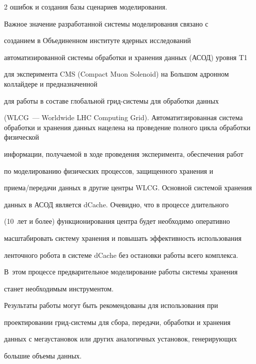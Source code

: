 \begin{multicols}{2}
ошибок и создания базы сценариев моделирования. 


   


   Важное значение разработанной системы моделирования связано с 


созданием в Объединенном институте ядерных исследований 


автоматизированной системы обработки и хранения данных (АСОД) уровня T1 


для эксперимента CMS (Compact Muon Solenoid) на Большом адронном коллайдере и предназначенной 


для работы в составе глобальной грид-сис\-те\-мы для обработки данных 


(WLCG~--- Worldwide LHC Computing Grid). Автоматитзированная система обработки и хранения данных нацелена на проведение полного цикла обработки физической 


информации, получаемой в ходе проведения эксперимента, обеспечения работ 


по моделированию физических процессов, защищенного хранения и 


при\-ема/пе\-ре\-да\-чи данных в другие центры WLCG. Основной системой хранения 


данных в АСОД является dCache. Очевидно, что в процессе длительного 


(10~лет и более) функционирования центра будет необходимо оперативно 


масштабировать систему хранения и повышать эффективность использования 


ленточного робота в системе dCache без остановки работы всего комплекса. 


В~этом процессе предварительное моделирование работы системы хранения 


станет необходимым инструментом.


   


   Результаты работы могут быть рекомендованы для использования при 


проектировании грид-сис\-те\-мы для сбора, передачи, обработки и хранения 


данных с мегаустановок или других аналогичных установок, генерирующих 


большие объемы данных.





{\small\frenchspacing


{%


}}
\end{multicols}
